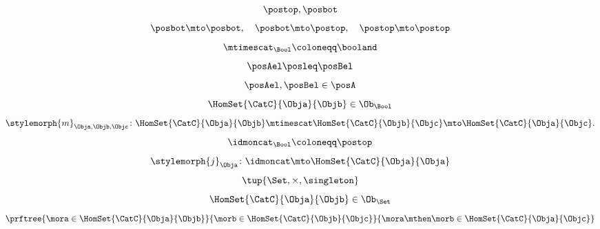 {\begin{forslides}
        \begin{equation*}
            \label{eq:poset_bool_b}
            \postop,\posbot
        \end{equation*}
        \begin{equation*}
            \label{eq:poset_bool_c}
            \posbot\mto \posbot, \quad \posbot\mto \postop, \quad \postop\mto \postop
        \end{equation*}
        \begin{equation*}
            \label{eq:poset_bool_d}
            \mtimescat_\Bool \coloneqq \booland
        \end{equation*}
        \begin{equation*}
            \label{eq:poset_bool_e}
            \posAel\posleq \posBel
        \end{equation*}
        \begin{equation*}
            \label{eq:poset_bool_f}
            \posAel,\posBel \in \posA
        \end{equation*}
        \begin{equation*}
            \label{eq:poset_bool_g}
            \HomSet{\CatC}{\Obja}{\Objb}\in \Ob_\Bool
        \end{equation*}
        \begin{equation*}
            \label{eq:poset_bool_h}
            \stylemorph{m}_{\Obja,\Objb,\Objc}\colon \HomSet{\CatC}{\Obja}{\Objb}\mtimescat \HomSet{\CatC}{\Objb}{\Objc}\mto \HomSet{\CatC}{\Obja}{\Objc}.
        \end{equation*}
        \begin{equation*}
            \label{eq:poset_bool_i}
            \idmoncat_\Bool \coloneqq \postop
        \end{equation*}
        \begin{equation*}
            \label{eq:poset_bool_k}
            \stylemorph{j}_\Obja\colon \idmoncat \mto \HomSet{\CatC}{\Obja}{\Obja}
        \end{equation*}
        \begin{equation*}
            \label{eq:poset_bool_j}
            \tup{\Set, \times, \singleton}
        \end{equation*}
        \begin{equation*}
            \label{eq:poset_bool_l}
            \HomSet{\CatC}{\Obja}{\Objb}\in \Ob_\Set
        \end{equation*}
        \begin{equation*}
            \label{eq:poset_bool_m}
            \prftree{\mora \in \HomSet{\CatC}{\Obja}{\Objb}}{\morb \in \HomSet{\CatC}{\Objb}{\Objc}}{{\mora\mthen \morb \in \HomSet{\CatC}{\Obja}{\Objc}}}

\end{equation*}
\end{forslides}}
